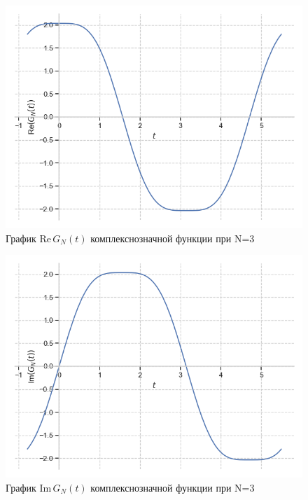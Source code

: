 \documentclass[a4paper, 16pt]{article}
\begin{document}
\begin{figure}[!htb]
    \centering
    \includegraphics[scale=0.8]{fourier_re_cfunc_n=3.png}
    \captionsetup{skip=0pt}
    \caption{График Re$\,G_N(t)$ комплекснозначной функции при N=3}
    \label{Рис:46}
\end{figure}
\begin{figure}[!htb]
    \centering
    \includegraphics[scale=0.8]{fourier_im_cfunc_n=3.png}
    \captionsetup{skip=0pt}
    \caption{График Im$\,G_N(t)$ комплекснозначной функции при N=3}
    \label{Рис:47}
\end{figure}
\newpage
\end{document}
